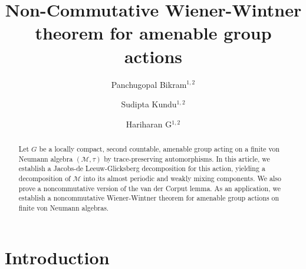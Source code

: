 \documentclass[11pt]{amsart}
\theoremstyle{definition}
\theoremstyle{myremark}
\numberwithin{equation}{section}
\begin{document}
	
	\title[Noncommutative Wiener-Wintner Theorems]{ Non-Commutative Wiener-Wintner theorem for amenable group actions}
	
	\author[P. Bikram]{Panchugopal Bikram$^{1, 2}$}
\address{$^{1}$School of Mathematical Sciences,
National Institute of Science Education and Research,  Bhubaneswar, Odisha, India  \newline  $^{2}$Homi Bhabha National Institute, Training School Complex, Anushakti Nagar, Mumbai 400094, India}
	
\author[S.Kundu]{Sudipta Kundu$^{1, 2}$}
	
\author[Hariharan G.]{Hariharan G$^{1, 2}$}
	
	  
    \maketitle


\begin{abstract}
Let \(G\) be a locally compact, second countable, amenable group acting on a finite von Neumann algebra 
\((\mathcal{M},\tau)\) by trace-preserving automorphisms. In this article, we establish a Jacobs-de Leeuw-Glicksberg decomposition for this action, yielding a decomposition of \(\mathcal{M}\) into its almost periodic and weakly mixing components. We also prove a noncommutative version of the van der Corput lemma. As an application, we establish a noncommutative Wiener-Wintner theorem for amenable group actions on finite von Neumann algebras.










\end{abstract}


\section{\textbf{Introduction}}
\end{document}
